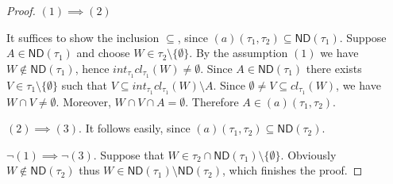 \documentclass[12pt]{amsart}
\theoremstyle{plain}
\theoremstyle{definition}
\theoremstyle{remark}
\newcommand{\cl}{\mathit{cl}}
\newcommand{\real}{\mathbb{R}}
\newcommand{\cK}{{\mathcal K}}
\newcommand{\mathint}{\mathit{int}}
\newcommand{\aideal}{\mathit{(a)}}
\newcommand{\topWithoutEmptyset}[1]{#1\setminus\lbrace\emptyset\rbrace}
\newcommand{\ND}{\mathsf{ND}}
\begin{document}
\begin{proof}  
$(1) \implies (2)$

It suffices to show the inclusion $\subseteq$, since
$\aideal(\tau_1, \tau_2) \subseteq \ND(\tau_1)$.
Suppose $A\in \ND(\tau_1)$ and choose
$W \in \tau_2\setminus\lbrace \emptyset \rbrace$.
By the assumption $(1)$ we have $W \not\in \ND(\tau_1)$, 
hence $\mathint_{\tau_1} \cl_{\tau_1} (W) \not= \emptyset$.
Since $A \in \ND(\tau_1)$ there exists 
$V\in \tau_1\setminus\lbrace\emptyset\rbrace$ such 
that $V \subseteq \mathint_{\tau_1} \cl_{\tau_1} (W) \setminus A$. 
Since $\emptyset \not= V \subseteq \cl_{\tau_1} (W)$, 
we have $W \cap V \not= \emptyset$. Moreover,
$W \cap V \cap A = \emptyset$. Therefore 
$A \in \aideal(\tau_1, \tau_2)$.

$(2) \implies (3)$.
It follows easily, since 
$\aideal(\tau_1, \tau_2) \subseteq \mathsf{ND}(\tau_2)$.

$\neg(1)\implies \neg(3)$.
Suppose that $W\in\tau_2\cap\mathsf{ND}(\tau_1) \setminus \lbrace\emptyset\rbrace$.
Obviously $W\not\in\ND(\tau_2)$ thus
$W \in \ND(\tau_1) \setminus \ND(\tau_2)$,
which finishes the proof.
\end{proof}
\end{document}
